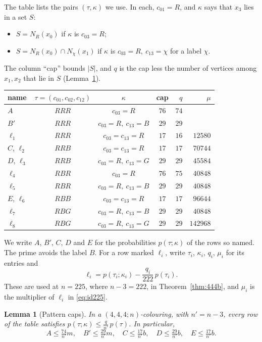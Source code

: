 \documentclass[11pt]{article}
\theoremstyle{spacedplain}
\newtheorem{lemma}[theorem]{Lemma}
\theoremstyle{spaceddef}
\theoremstyle{spacedremark}
\begin{document}
The table lists the pairs $(\tau,\kappa)$ we use.
In each, $c_{01}=R$, and $\kappa$ says that $x_3$ lies in a set $S$:
\begin{itemize}
\item $S=N_R(x_0)$ if $\kappa$ is $c_{03}=R$;
\item $S=N_R(x_0)\cap N_\chi(x_1)$ if $\kappa$ is $c_{03}=R,\ c_{13}=\chi$ for a label $\chi$.
\end{itemize}
The column ``cap'' bounds $|S|$, and $q$ is the cap less the number of vertices among $x_1,x_2$ that lie in $S$ (Lemma~\ref{lem:fivecaps}).
\begin{center}\small
\begin{tabular}{lcccrr}
\toprule
name & $\tau=(c_{01},c_{02},c_{12})$ & $\kappa$ & cap & $q$ & $\mu$\\
\midrule
$A$ & $RRR$ & $c_{03}=R$ & $76$ & $74$ & \\
$B'$ & $RRR$ & $c_{03}=R,\ c_{13}=B$ & $29$ & $29$ & \\
$\ell_1$ & $RRR$ & $c_{03}=c_{13}=R$ & $17$ & $16$ & $12580$\\
$C$, $\ell_2$ & $RRB$ & $c_{03}=c_{13}=R$ & $17$ & $17$ & $70744$\\
$D$, $\ell_3$ & $RRB$ & $c_{03}=R,\ c_{13}=G$ & $29$ & $29$ & $45584$\\
$\ell_4$ & $RBR$ & $c_{03}=R$ & $76$ & $75$ & $40848$\\
$\ell_5$ & $RBR$ & $c_{03}=R,\ c_{13}=B$ & $29$ & $29$ & $40848$\\
$E$, $\ell_6$ & $RBB$ & $c_{03}=c_{13}=R$ & $17$ & $17$ & $96644$\\
$\ell_7$ & $RBG$ & $c_{03}=R,\ c_{13}=B$ & $29$ & $29$ & $40848$\\
$\ell_8$ & $RBG$ & $c_{03}=R,\ c_{13}=G$ & $29$ & $29$ & $142968$\\
\bottomrule
\end{tabular}
\end{center}

We write $A$, $B'$, $C$, $D$ and $E$ for the probabilities $p(\tau;\kappa)$ of the rows so named.
The prime avoids the label $B$.
For a row marked $\ell_i$, write $\tau_i$, $\kappa_i$, $q_i$, $\mu_i$ for its entries and
\[
\ell_i=p(\tau_i;\kappa_i)-\frac{q_i}{222}\,p(\tau_i).
\]
These are used at $n=225$, where $n-3=222$, in Theorem~\ref{thm:444b}, and $\mu_i$ is the multiplier of $\ell_i$ in \eqref{eq:id225}.

\begin{lemma}[Pattern caps]\label{lem:fivecaps}
In a $(4,4,4;n)$-colouring, with $n'=n-3$, every row of the table satisfies $p(\tau;\kappa)\le\frac{q}{n'}\,p(\tau)$.
In particular,
\[
A\le\tfrac{74}{n'}m,\quad B'\le\tfrac{29}{n'}m,\quad C\le\tfrac{17}{n'}b,\quad D\le\tfrac{29}{n'}b,\quad E\le\tfrac{17}{n'}b .
\]
\end{lemma}
\end{document}
